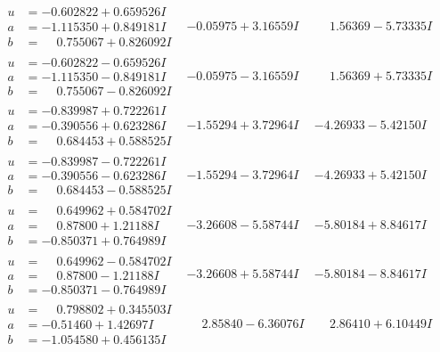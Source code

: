 \documentclass[1p]{elsarticle_modified}
\theoremstyle{definition}
\begin{document}
$$\begin{array}{c|c|c}
\begin{aligned}
u &= -0.602822 + 0.659526 I \\
a &= -1.115350 + 0.849181 I \\
b &= \phantom{-}0.755067 + 0.826092 I\end{aligned}
 & -0.05975 + 3.16559 I & \phantom{-}1.56369 - 5.73335 I \\ \hline\begin{aligned}
u &= -0.602822 - 0.659526 I \\
a &= -1.115350 - 0.849181 I \\
b &= \phantom{-}0.755067 - 0.826092 I\end{aligned}
 & -0.05975 - 3.16559 I & \phantom{-}1.56369 + 5.73335 I \\ \hline\begin{aligned}
u &= -0.839987 + 0.722261 I \\
a &= -0.390556 + 0.623286 I \\
b &= \phantom{-}0.684453 + 0.588525 I\end{aligned}
 & -1.55294 + 3.72964 I & -4.26933 - 5.42150 I \\ \hline\begin{aligned}
u &= -0.839987 - 0.722261 I \\
a &= -0.390556 - 0.623286 I \\
b &= \phantom{-}0.684453 - 0.588525 I\end{aligned}
 & -1.55294 - 3.72964 I & -4.26933 + 5.42150 I \\ \hline\begin{aligned}
u &= \phantom{-}0.649962 + 0.584702 I \\
a &= \phantom{-}0.87800 + 1.21188 I \\
b &= -0.850371 + 0.764989 I\end{aligned}
 & -3.26608 - 5.58744 I & -5.80184 + 8.84617 I \\ \hline\begin{aligned}
u &= \phantom{-}0.649962 - 0.584702 I \\
a &= \phantom{-}0.87800 - 1.21188 I \\
b &= -0.850371 - 0.764989 I\end{aligned}
 & -3.26608 + 5.58744 I & -5.80184 - 8.84617 I \\ \hline\begin{aligned}
u &= \phantom{-}0.798802 + 0.345503 I \\
a &= -0.51460 + 1.42697 I \\
b &= -1.054580 + 0.456135 I\end{aligned}
 & \phantom{-}2.85840 - 6.36076 I & \phantom{-}2.86410 + 6.10449 I \\ \hline\begin{aligned}

\end{aligned}
\end{array}$$
\end{document}
